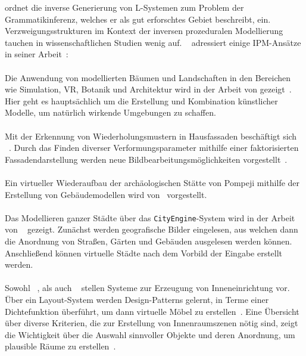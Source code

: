 \citeauthor{higuera_2010} ordnet die inverse Generierung von L-Systemen zum Problem der Grammatikinferenz, welches er
als gut erforschtes Gebiet beschreibt, ein.
Verzweigungsstrukturen im Kontext der inversen prozeduralen Modellierung tauchen in wissenschaftlichen Studien wenig auf.
~\citeauthor{guo_2020} adressiert einige IPM-Ansätze in seiner Arbeit~\cite{guo_2020}:\\~\\
Die Anwendung von modellierten Bäumen und Landschaften in den Bereichen wie Simulation, VR, Botanik und Architektur
wird in der Arbeit von \citeauthor{deussen_2010} gezeigt~\cite{deussen_2010}.
Hier geht es hauptsächlich um die Erstellung und Kombination künstlicher Modelle, um natürlich wirkende Umgebungen zu
schaffen.\\~\\
Mit der Erkennung von Wiederholungsmustern in Hausfassaden beschäftigt sich\\~\citeauthor{alhalawani_2013}.
Durch das Finden diverser Verformungsparameter mithilfe einer faktorisierten Fassadendarstellung werden neue
Bildbearbeitungsmöglichkeiten  vorgestellt~\cite{alhalawani_2013}.\\~\\
Ein virtueller Wiederaufbau der archäologischen Stätte von Pompeji mithilfe der Erstellung von Gebäudemodellen wird
von~\citeauthor{mueller_2006} vorgestellt.\\~\\
Das Modellieren ganzer Städte über das \texttt{CityEngine}-System wird in der Arbeit von ~\citeauthor{parish_2001}
gezeigt.
Zunächst werden geografische Bilder eingelesen, aus welchen dann die Anordnung von Straßen, Gärten und Gebäuden
ausgelesen werden können.
Anschließend können virtuelle Städte nach dem Vorbild der Eingabe erstellt werden.\\~\\
Sowohl ~\citeauthor{merrell_2011}, als auch ~\citeauthor{zhang_2019} stellen Systeme zur Erzeugung von Inneneinrichtung
vor.
Über ein Layout-System werden Design-Patterns gelernt, in Terme einer Dichtefunktion überführt, um dann virtuelle
Möbel zu erstellen~\cite{merrell_2011}.
Eine Übersicht über diverse Kriterien, die zur Erstellung von Innenraumszenen nötig sind, zeigt die
Wichtigkeit über die Auswahl sinnvoller Objekte und deren Anordnung, um plausible Räume zu erstellen~\cite{zhang_2019}.

\newpage

